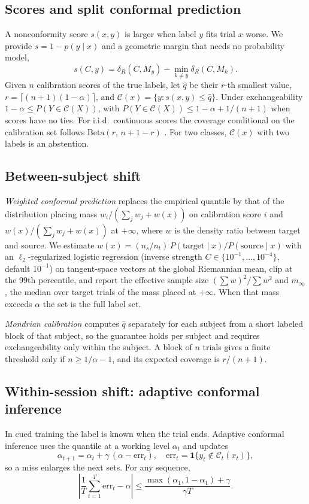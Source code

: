 \documentclass[letterpaper, 10pt, conference]{ieeeconf}
\newcommand{\dR}{\delta_R}
\begin{document}
\subsection{Scores and split conformal prediction}
A nonconformity score $s(x,y)$ is larger when label $y$ fits trial $x$ worse. We
provide $s=1-p(y\mid x)$ and a geometric margin that needs no probability model,
\begin{equation}
s(C,y)=\dR(C,M_y)-\min_{k\neq y}\dR(C,M_k).
\end{equation}
Given $n$ calibration scores of the true labels, let $\hat q$ be their $r$-th
smallest value, $r=\lceil (n+1)(1-\alpha)\rceil$, and
$\mathcal C(x)=\{y: s(x,y)\le \hat q\}$. Under exchangeability
$1-\alpha\le P(Y\in\mathcal C(X))$, with $P(Y\in\mathcal C(X))\le 1-\alpha+1/(n+1)$
when scores have no ties. For i.i.d.\ continuous scores the coverage
conditional on the calibration set follows $\mathrm{Beta}(r,\,n+1-r)$
\cite{vovk2012}. For
two classes, $\mathcal C(x)$ with two labels is an abstention.

\subsection{Between-subject shift}
\emph{Weighted conformal prediction} \cite{tibshirani2019} replaces the empirical
quantile by that of the distribution placing mass $w_i/(\sum_j w_j+w(x))$ on
calibration score $i$ and $w(x)/(\sum_j w_j+w(x))$ at $+\infty$, where $w$ is the
density ratio between target and source. We estimate
$w(x)=(n_s/n_t)\,P(\mathrm{target}\mid x)/P(\mathrm{source}\mid x)$ with an
$\ell_2$-regularized logistic regression (inverse strength
$C\in\{10^{-1},\dots,10^{-4}\}$, default $10^{-1}$) on tangent-space vectors at
the global Riemannian mean, clip at the 99th percentile, and report the effective sample
size $(\sum w)^2/\sum w^2$ and $m_\infty$, the median over target trials of the
mass placed at $+\infty$. When that mass exceeds $\alpha$ the set is the full
label set.

\emph{Mondrian calibration} computes $\hat q$ separately for each subject from a
short labeled block of that subject, so the guarantee holds per subject and
requires exchangeability only within the subject. A block of $n$ trials gives a
finite threshold only if $n\ge 1/\alpha-1$, and its expected coverage is
$r/(n+1)$.

\subsection{Within-session shift: adaptive conformal inference}
In cued training the label is known when the trial ends. Adaptive conformal
inference \cite{gibbs2021} uses the quantile at a working level $\alpha_t$ and
updates
\begin{equation}
\alpha_{t+1}=\alpha_t+\gamma\,(\alpha-\mathrm{err}_t),\quad
\mathrm{err}_t=\mathbf 1\{y_t\notin\mathcal C_t(x_t)\},
\end{equation}
so a miss enlarges the next sets. For any sequence,
\begin{equation}
\left|\frac{1}{T}\sum_{t=1}^{T}\mathrm{err}_t-\alpha\right|\le
\frac{\max(\alpha_1,1-\alpha_1)+\gamma}{\gamma T}. \label{eq:aci}
\end{equation}
\end{document}
